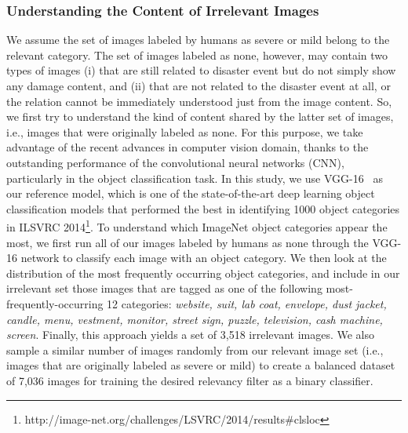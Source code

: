 \documentclass{iscram}
\begin{document}
\subsubsection{Understanding the Content of Irrelevant Images}
We assume the set of images labeled by humans as severe or mild belong to the relevant category. The set of images labeled as none, however, may contain two types of images (i) that are still related to disaster event but do not simply show any damage content, and (ii) that are not related to the disaster event at all, or the relation cannot be immediately understood just from the image content. So, we first try to understand the kind of content shared by the latter set of images, i.e., images that were originally labeled as none. For this purpose, we take advantage of the recent advances in computer vision domain, thanks to the outstanding performance of the convolutional neural networks (CNN), particularly in the object classification task. In this study, we use VGG-16~\parencite{simonyan2014very} as our reference model, which is one of the state-of-the-art deep learning object classification models that performed the best in identifying 1000 object categories in ILSVRC 2014\footnote{http://image-net.org/challenges/LSVRC/2014/results\#clsloc}. To understand which ImageNet object categories appear the most, we first run all of our images labeled by humans as none through the VGG-16 network to classify each image with an object category. We then look at the distribution of the most frequently occurring object categories, and include in our irrelevant set those images that are tagged as one of the following most-frequently-occurring 12 categories: \emph{website, suit, lab coat, envelope, dust jacket, candle, menu, vestment, monitor, street sign, puzzle, television, cash machine, screen}. Finally, this approach yields a set of 3,518 irrelevant images. We also sample a similar number of images randomly from our relevant image set (i.e., images that are originally labeled as severe or mild) to create a balanced dataset of 7,036 images for training the desired relevancy filter as a binary classifier.
\end{document}
